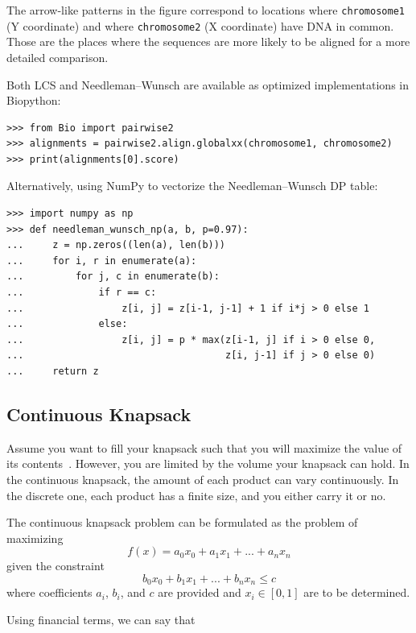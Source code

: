 \documentclass[justified, sixbynine]{tufte-book}
\def\ft{\small\tt}
\theoremstyle{plain}%
\newtheorem * {corollary}{Corollary}
\theoremstyle{definition}
\theoremstyle{remark}
\newtheorem * {remark}{Remark}
\newtheorem * {note}{Note}
\begin{document}
\begin{fullwidth}
The arrow-like patterns in the figure correspond to locations where {\ft chromosome1} (Y coordinate) and where {\ft chromosome2} (X coordinate) have DNA in common. Those are the places where the sequences are more likely to be aligned for a more detailed comparison.

Both LCS and Needleman--Wunsch are available as optimized implementations in Biopython:

\begin{lstlisting}
>>> from Bio import pairwise2
>>> alignments = pairwise2.align.globalxx(chromosome1, chromosome2)
>>> print(alignments[0].score)
\end{lstlisting}

Alternatively, using NumPy to vectorize the Needleman--Wunsch DP table:

\begin{lstlisting}
>>> import numpy as np
>>> def needleman_wunsch_np(a, b, p=0.97):
...     z = np.zeros((len(a), len(b)))
...     for i, r in enumerate(a):
...         for j, c in enumerate(b):
...             if r == c:
...                 z[i, j] = z[i-1, j-1] + 1 if i*j > 0 else 1
...             else:
...                 z[i, j] = p * max(z[i-1, j] if i > 0 else 0,
...                                   z[i, j-1] if j > 0 else 0)
...     return z
\end{lstlisting}

\subsection{Continuous Knapsack}

Assume you want to fill your knapsack such that you will maximize the value of its contents~\cite{knapsack}.  However, you are limited by the volume your knapsack can hold. In the continuous knapsack, the amount of each product can vary continuously. In the discrete one, each product has a finite size, and you either carry it or no.

The continuous knapsack problem can be formulated as the problem of
maximizing
\begin{equation}
f(x)=a_0x_0+a_1x_1+...+a_nx_n
\end{equation}
given the constraint
\begin{equation}
b_0x_0+b_1x_1+...+b_nx_n\leq c
\end{equation}
where coefficients $a_i$, $b_i$, and $c$ are provided and $x_i\in [0, 1]$ are
to be determined.

Using financial terms, we can say that


\end{fullwidth}
\end{document}
